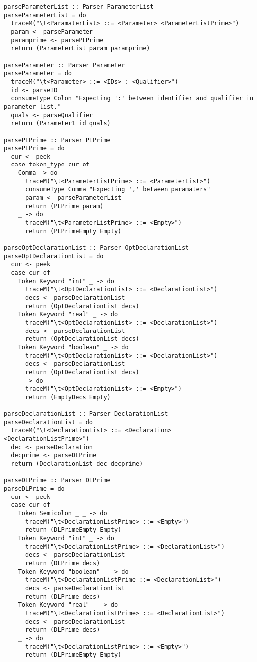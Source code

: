 \documentclass[11pt]{article}
\begin{document}
\begin{verbatim}
parseParameterList :: Parser ParameterList
parseParameterList = do
  traceM("\t<ParamaterList> ::= <Parameter> <ParameterListPrime>")
  param <- parseParameter
  paramprime <- parsePLPrime
  return (ParameterList param paramprime)

parseParameter :: Parser Parameter
parseParameter = do
  traceM("\t<Parameter> ::= <IDs> : <Qualifier>")
  id <- parseID
  consumeType Colon "Expecting ':' between identifier and qualifier in parameter list."
  quals <- parseQualifier
  return (Parameter1 id quals)

parsePLPrime :: Parser PLPrime
parsePLPrime = do
  cur <- peek
  case token_type cur of
    Comma -> do
      traceM("\t<ParameterListPrime> ::= <ParameterList>")
      consumeType Comma "Expecting ',' between paramaters"
      param <- parseParameterList
      return (PLPrime param)
    _ -> do
      traceM("\t<ParameterListPrime> ::= <Empty>")
      return (PLPrimeEmpty Empty)

parseOptDeclarationList :: Parser OptDeclarationList
parseOptDeclarationList = do
  cur <- peek
  case cur of
    Token Keyword "int" _ -> do
      traceM("\t<OptDeclarationList> ::= <DeclarationList>")
      decs <- parseDeclarationList
      return (OptDeclarationList decs)
    Token Keyword "real" _ -> do
      traceM("\t<OptDeclarationList> ::= <DeclarationList>")
      decs <- parseDeclarationList
      return (OptDeclarationList decs)
    Token Keyword "boolean" _ -> do
      traceM("\t<OptDeclarationList> ::= <DeclarationList>")
      decs <- parseDeclarationList
      return (OptDeclarationList decs)
    _ -> do
      traceM("\t<OptDeclarationList> ::= <Empty>")
      return (EmptyDecs Empty)

parseDeclarationList :: Parser DeclarationList
parseDeclarationList = do
  traceM("\t<DeclarationList> ::= <Declaration> <DeclarationListPrime>")
  dec <- parseDeclaration
  decprime <- parseDLPrime
  return (DeclarationList dec decprime)

parseDLPrime :: Parser DLPrime
parseDLPrime = do
  cur <- peek
  case cur of
    Token Semicolon _ _ -> do
      traceM("\t<DeclarationListPrime> ::= <Empty>")
      return (DLPrimeEmpty Empty)
    Token Keyword "int" _ -> do
      traceM("\t<DeclarationListPrime> ::= <DeclarationList>")
      decs <- parseDeclarationList
      return (DLPrime decs)
    Token Keyword "boolean" _ -> do
      traceM("\t<DeclarationListPrime ::= <DeclarationList>")
      decs <- parseDeclarationList
      return (DLPrime decs)
    Token Keyword "real" _ -> do
      traceM("\t<DeclarationListPrime> ::= <DeclarationList>")
      decs <- parseDeclarationList
      return (DLPrime decs)
    _ -> do
      traceM("\t<DeclarationListPrime> ::= <Empty>")
      return (DLPrimeEmpty Empty)


\end{verbatim}
\end{document}
